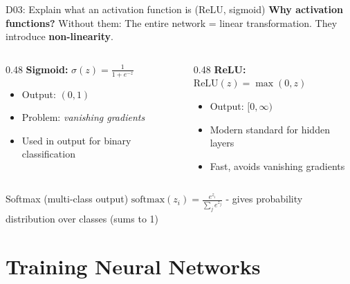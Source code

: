 \documentclass[aspectratio=169, 10pt]{beamer}
\begin{document}
\begin{frame}{D03: Explain what an activation function is (ReLU, sigmoid)}
    \textbf{Why activation functions?} Without them: The entire network = linear transformation. They introduce \textbf{non-linearity}.

    \vspace{0.2cm}
    \begin{columns}[T]
        \begin{column}{0.48\textwidth}
            \textbf{Sigmoid:} $\sigma(z) = \frac{1}{1 + e^{-z}}$
            \begin{itemize}
                \item Output: $(0, 1)$
                \item Problem: \textit{vanishing gradients}
                \item Used in output for binary classification
            \end{itemize}
        \end{column}
        \begin{column}{0.48\textwidth}
            \textbf{ReLU:} $\text{ReLU}(z) = \max(0, z)$
            \begin{itemize}
                \item Output: $[0, \infty)$
                \item Modern standard for hidden layers
                \item Fast, avoids vanishing gradients
            \end{itemize}
        \end{column}
    \end{columns}

    \vspace{0.2cm}
    \begin{block}{\footnotesize Softmax (multi-class output)}
        \footnotesize $\text{softmax}(z_i) = \frac{e^{z_i}}{\sum_j e^{z_j}}$ - gives probability distribution over classes (sums to 1)
    \end{block}
\end{frame}

\section{Training Neural Networks}
\end{document}
